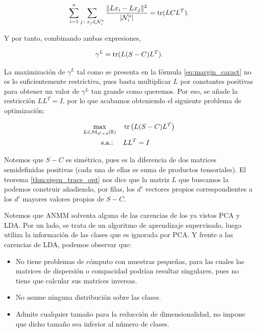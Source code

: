 \begin{equation*}
    \sum_{i=1}^n\sum\limits_{j \colon x_j \in \mathcal{N}_i^o} \frac{\|Lx_i - Lx_j \|^2}{|\mathcal{N}_i^o|} = \operatorname{tr}(LCL^T).
\end{equation*}

Y por tanto, combinando ambas expresiones,

\begin{equation} \label{eq:margin_caract}
    \gamma^L = \operatorname{tr}(L(S-C)L^T).
\end{equation}

La maximización de $\gamma^L$ tal como se presenta en la fórmula \ref{eq:margin_caract} no es lo suficientemente restrictiva, pues basta multiplicar $L$ por constantes positivas para obtener un valor de $\gamma^L$ tan grande como queremos. Por eso, se añade la restricción $LL^T = I$, por lo que acabamos obteniendo el siguiente problema de optimización:

\begin{align*}
    \max_{L \in \mathcal{M}_{d'\times d}(\mathbb{R})} &\quad \operatorname{tr}\left(L(S-C)L^T\right)  \\
    \text{s.a.: } &\quad LL^T = I
\end{align*}

Notemos que $S - C$ es simétrica, pues es la diferencia de dos matrices semidefinidas positivas (cada una de ellas es suma de productos tensoriales). El teorema \ref{thm:eigen_trace_opt} nos dice que la matriz $L$ que buscamos la podemos construir añadiendo, por filas, los $d'$ vectores propios correspondientes a los $d'$ mayores valores propios de $S-C$.

Notemos que ANMM solventa alguna de las carencias de los ya vistos PCA y LDA. Por un lado, se trata de un algoritmo de aprendizaje supervisado, luego utiliza la información de las clases que es ignorada por PCA. Y frente a las carencias de LDA, podemos observar que:

\begin{itemize}
    \item No tiene problemas de cómputo con muestras pequeñas, para las cuales las matrices de dispersión o compacidad podrían resultar singulares, pues no tiene que calcular sus matrices inversas.
    \item No asume ninguna distribución sobre las clases.
    \item Admite cualquier tamaño para la reducción de dimensionalidad, no impone que dicho tamaño sea inferior al número de clases.
\end{itemize}

